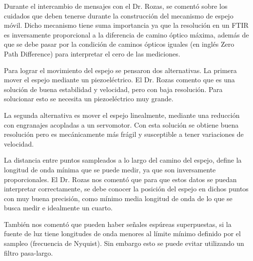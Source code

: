 \documentclass[11pt,titlepage]{article}
\begin{document}
Durante el intercambio de mensajes con el Dr. Rozas, se comentó sobre los cuidados que deben tenerse durante la construcción del mecanismo de espejo móvil. Dicho mecanismo tiene suma importancia ya que la resolución en un FTIR es
inversamente proporcional a la diferencia de camino óptico máxima, además de que se debe pasar por la condición de caminos ópticos iguales (en inglés Zero Path Difference) para interpretar el cero de las mediciones.\par
Para lograr el movimiento del espejo se pensaron dos alternativas. La primera mover el espejo mediante un piezoeléctrico. El Dr. Rozas comento que es una solución de buena estabilidad y velocidad, pero con baja resolución. Para solucionar esto se necesita un piezoeléctrico muy grande.\par
La segunda alternativa es mover el espejo linealmente, mediante una reducción con engranajes acopladas a un servomotor. Con esta solución se obtiene buena resolución pero es mecánicamente más frágil y susceptible a tener variaciones de velocidad.\par

La distancia entre puntos sampleados a lo largo del camino del espejo, define la longitud de onda mínima que se puede medir, ya que son inversamente proporcionales.
El Dr. Rozas nos comentó que para que estos datos se puedan interpretar correctamente, se debe conocer la posición del espejo en dichos puntos con muy buena precisión, como mínimo media longitud de onda de lo que se busca medir
e idealmente un cuarto.\par
También nos comentó que pueden haber señales espúreas superpuestas, si la fuente de luz tiene longitudes de onda menores al límite mínimo definido por el sampleo (frecuencia de Nyquist). Sin embargo esto se puede evitar utilizando un filtro pasa-largo.\par
\end{document}
